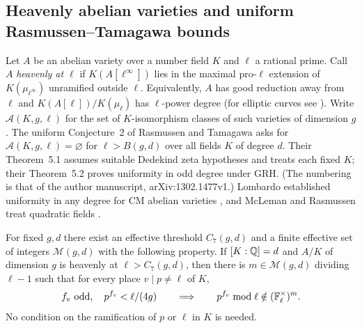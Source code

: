 \subsection{Heavenly abelian varieties and uniform Rasmussen--Tamagawa bounds}
\label{dir:sec:heavenly}

Let $A$ be an abelian variety over a number field $K$ and $\ell$ a rational prime. Call
$A$ \emph{heavenly at $\ell$} if $K(A[\ell^\infty])$ lies in the maximal pro-$\ell$
extension of $K(\mu_{\ell^\infty})$ unramified outside $\ell$. Equivalently, $A$ has
good reduction away from $\ell$ and $K(A[\ell])/K(\mu_\ell)$ has $\ell$-power degree
(for elliptic curves see \cite[Lemma~2.2]{OHara2026Heavenly}). Write $\mathcal A(K,g,\ell)$ for the set of
$K$-isomorphism classes of such varieties of dimension $g$. The uniform Conjecture~2
of Rasmussen and Tamagawa \cite{RasmussenTamagawa2017Arithmetic} asks for
$\mathcal A(K,g,\ell)=\varnothing$ for $\ell>B(g,d)$ over all fields $K$ of degree $d$.
Their Theorem~5.1 assumes suitable Dedekind zeta hypotheses and treats each fixed $K$;
their Theorem~5.2 proves uniformity in odd degree under GRH. (The numbering is that of
the author manuscript, arXiv:1302.1477v1.) Lombardo established uniformity in any
degree for CM abelian varieties \cite{Lombardo2018Uniform}, and McLeman and Rasmussen
treat quadratic fields \cite{McLemanRasmussen2026Heavenly}.

\begin{lemma}\label{dir:lem:rt}
For fixed $g,d$ there exist an effective threshold $C_7(g,d)$ and a finite effective
set of integers $\mathcal M(g,d)$ with the following property. If $[K:\mathbb{Q}]=d$ and $A/K$
of dimension $g$ is heavenly at $\ell>C_7(g,d)$, then there is $m\in\mathcal M(g,d)$
dividing $\ell-1$ such that for every place $v\mid p\ne\ell$ of $K$,
\[
 f_v\text{ odd},\quad p^{f_v}<\ell/(4g)
 \qquad\Longrightarrow\qquad
 p^{f_v}\bmod\ell\notin(\mathbb{F}_\ell^\times)^m .
\]
No condition on the ramification of $p$ or $\ell$ in $K$ is needed.
\end{lemma}

